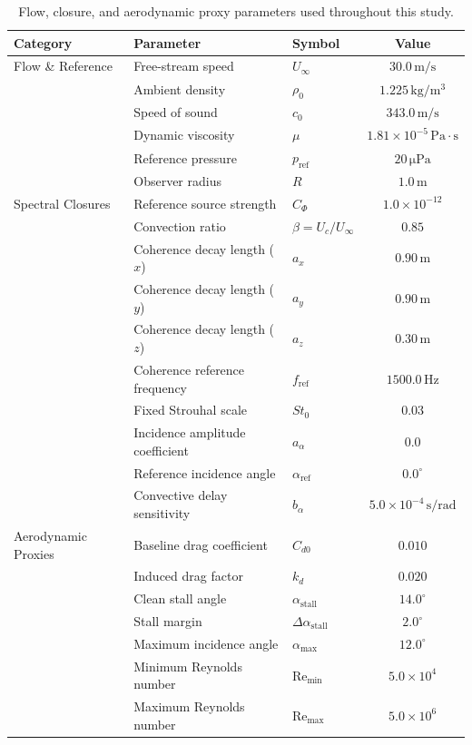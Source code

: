 \documentclass[11pt]{article}
\begin{document}
\begin{table}[htbp]
\centering
\caption{Flow, closure, and aerodynamic proxy parameters used throughout this study.}
\label{tab:appendix_parameters}
\begin{tabular}{lllc}
\toprule
\textbf{Category} & \textbf{Parameter} & \textbf{Symbol} & \textbf{Value} \\
\midrule
Flow \& Reference & Free-stream speed & $U_\infty$ & $30.0\,\mathrm{m/s}$ \\
 & Ambient density & $\rho_0$ & $1.225\,\mathrm{kg/m^3}$ \\
 & Speed of sound & $c_0$ & $343.0\,\mathrm{m/s}$ \\
 & Dynamic viscosity & $\mu$ & $1.81\times 10^{-5}\,\mathrm{Pa\cdot s}$ \\
 & Reference pressure & $p_{\mathrm{ref}}$ & $20\,\mathrm{\mu Pa}$ \\
 & Observer radius & $R$ & $1.0\,\mathrm{m}$ \\
\midrule
Spectral Closures & Reference source strength & $C_\Phi$ & $1.0\times 10^{-12}$ \\
 & Convection ratio & $\beta = U_c / U_\infty$ & $0.85$ \\
 & Coherence decay length ($x$) & $a_x$ & $0.90\,\mathrm{m}$ \\
 & Coherence decay length ($y$) & $a_y$ & $0.90\,\mathrm{m}$ \\
 & Coherence decay length ($z$) & $a_z$ & $0.30\,\mathrm{m}$ \\
 & Coherence reference frequency & $f_{\mathrm{ref}}$ & $1500.0\,\mathrm{Hz}$ \\
 & Fixed Strouhal scale & $\mathit{St}_0$ & $0.03$ \\
 & Incidence amplitude coefficient & $a_\alpha$ & $0.0$ \\
 & Reference incidence angle & $\alpha_{\mathrm{ref}}$ & $0.0^\circ$ \\
 & Convective delay sensitivity & $b_\alpha$ & $5.0\times 10^{-4}\,\mathrm{s/rad}$ \\
\midrule
Aerodynamic Proxies & Baseline drag coefficient & $C_{d0}$ & $0.010$ \\
 & Induced drag factor & $k_d$ & $0.020$ \\
 & Clean stall angle & $\alpha_{\mathrm{stall}}$ & $14.0^\circ$ \\
 & Stall margin & $\Delta\alpha_{\mathrm{stall}}$ & $2.0^\circ$ \\
 & Maximum incidence angle & $\alpha_{\mathrm{max}}$ & $12.0^\circ$ \\
 & Minimum Reynolds number & $\mathrm{Re}_{\mathrm{min}}$ & $5.0\times 10^4$ \\
 & Maximum Reynolds number & $\mathrm{Re}_{\mathrm{max}}$ & $5.0\times 10^6$ \\
\bottomrule
\end{tabular}
\end{table}
\end{document}

